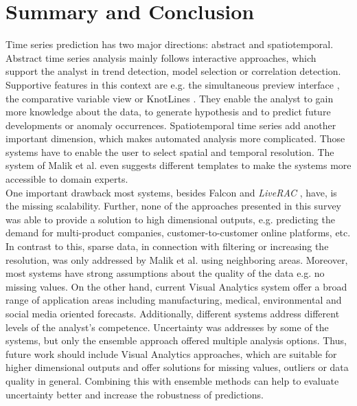 \documentclass[electronic]{vgtc}             %
\begin{document}
\section{Summary and Conclusion}
Time series prediction has two major directions: abstract and spatiotemporal.
Abstract time series analysis mainly follows interactive approaches, which
support the analyst in trend detection, model selection or correlation detection. 
Supportive features in this context are e.g. the simultaneous preview interface \cite{buono:2007}, the comparative variable view \cite{steed:2017} or KnotLines \cite{Xie:2014}.
They enable the analyst to gain more knowledge about the data, to generate hypothesis and to predict future developments or anomaly occurrences.
Spatiotemporal time series add another important dimension, which makes automated analysis more complicated. 
Those systems have to enable the user to select spatial and temporal resolution.
The system of Malik et al. \cite{malik:2014} even suggests different templates to make the systems more accessible to domain experts.\\
One important drawback most systems, besides Falcon \cite{steed:2017} and \textit{LiveRAC} \cite{McLachlan:2008}, have, is the missing scalability. 
Further, none of the approaches presented in this survey was able to provide a solution to high dimensional outputs, e.g. predicting the demand for multi-product companies, customer-to-customer online platforms, etc.
In contrast to this, sparse data, in connection with filtering or increasing the resolution, was only addressed by Malik et al. \cite{malik:2014} using neighboring areas.
Moreover, most systems have strong assumptions about the quality of the data e.g. no missing values.
On the other hand, current Visual Analytics system offer a broad range of application areas including manufacturing, medical, environmental and social media oriented forecasts.
Additionally, different systems address different levels of the analyst's competence.
Uncertainty was addresses by some of the systems, but only the ensemble approach \cite{koepp:2014} offered multiple analysis options.
Thus, future work should include Visual Analytics approaches, which are suitable for higher dimensional outputs and offer solutions for missing values, outliers or data quality in general.
Combining this with ensemble methods can help to evaluate uncertainty better and increase the robustness of predictions.

%
%
%

%


\end{document}
